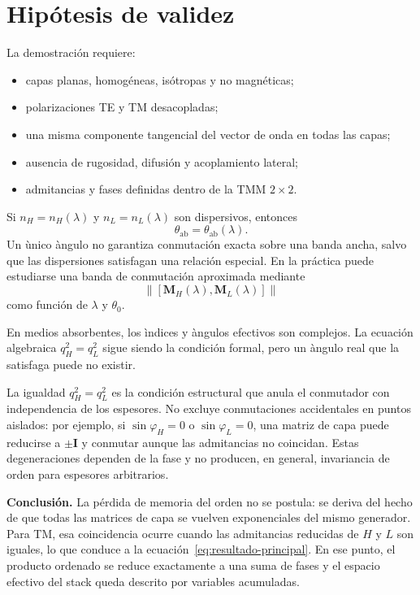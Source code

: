 \documentclass[10pt,a4paper]{article}
\newcommand{\M}{\mathbf{M}}
\newcommand{\I}{\mathbf{I}}
\newcommand{\comm}[2]{\left[#1,#2\right]}
\begin{document}
\section{Hip\'otesis de validez}

La demostraci\'on requiere:
\begin{itemize}
\item capas planas, homog\'eneas, is\'otropas y no magn\'eticas;
\item polarizaciones TE y TM desacopladas;
\item una misma componente tangencial del vector de onda en todas las capas;
\item ausencia de rugosidad, difusi\'on y acoplamiento lateral;
\item admitancias y fases definidas dentro de la TMM $2\times2$.
\end{itemize}

Si $n_H=n_H(\lambda)$ y $n_L=n_L(\lambda)$ son dispersivos, entonces
\begin{equation}
\theta_{\mathrm{ab}}=\theta_{\mathrm{ab}}(\lambda).
\end{equation}
Un \`unico \`angulo no garantiza conmutaci\'on exacta sobre una banda ancha, salvo que las dispersiones satisfagan una relaci\'on especial. En la pr\'actica puede estudiarse una banda de conmutaci\'on aproximada mediante
\begin{equation}
\left\|\comm{\M_H(\lambda)}{\M_L(\lambda)}\right\|
\end{equation}
como funci\'on de $\lambda$ y $\theta_0$.

En medios absorbentes, los \`indices y \`angulos efectivos son complejos. La ecuaci\'on algebraica $q_H^2=q_L^2$ sigue siendo la condici\'on formal, pero un \`angulo real que la satisfaga puede no existir.

La igualdad $q_H^2=q_L^2$ es la condici\'on estructural que anula el conmutador con independencia de los espesores. No excluye conmutaciones accidentales en puntos aislados: por ejemplo, si $\sin\varphi_H=0$ o $\sin\varphi_L=0$, una matriz de capa puede reducirse a $\pm\I$ y conmutar aunque las admitancias no coincidan. Estas degeneraciones dependen de la fase y no producen, en general, invariancia de orden para espesores arbitrarios.

\begin{resultbox}
\textbf{Conclusi\'on.} La p\'erdida de memoria del orden no se postula: se deriva del hecho de que todas las matrices de capa se vuelven exponenciales del mismo generador. Para TM, esa coincidencia ocurre cuando las admitancias reducidas de $H$ y $L$ son iguales, lo que conduce a la ecuaci\'on~\eqref{eq:resultado-principal}. En ese punto, el producto ordenado se reduce exactamente a una suma de fases y el espacio efectivo del stack queda descrito por variables acumuladas.
\end{resultbox}
\end{document}
